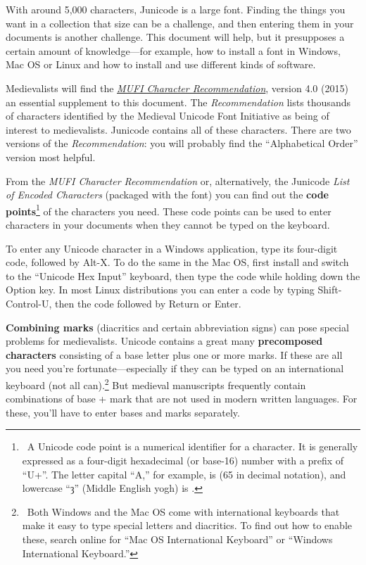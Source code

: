 With around 5,000 characters, Junicode is a large font. Finding the things you
want in a collection that size can be a challenge, and then entering them in your
documents is another challenge. This document will help, but it
presupposes a certain amount of knowledge—for example, how to install a font in
Windows, Mac OS or Linux and how to install and use different kinds of software.

Medievalists will find the \href{https://bora.uib.no/bora-xmlui/handle/1956/10699}%
{\textit{MUFI Character Recommendation}}, version 4.0 (2015)
an essential supplement to this document. The \textit{Recommendation} lists
thousands of characters identified by the
Medieval Unicode Font Initiative as being of interest to medievalists. Junicode
contains all of these characters. There are two versions of the \textit{Recommendation}:
you will probably find the “Alphabetical Order” version most helpful.

From the \textit{MUFI Character Recommendation} or, alternatively, the Junicode
\textit{List of Encoded Characters} (packaged with the font) you can find out
the \textbf{code points}\footnote{\ A Unicode code point is a numerical identifier for a character.
It is generally expressed as a
four-digit hexadecimal (or base-16) number with a prefix of ``U+''. The letter
capital ``A,'' for example, is  (65
in decimal notation), and lowercase ``ȝ'' (Middle English yogh) is .}
of the characters you need. These code points can be used to enter
characters in your documents when they cannot be typed on the keyboard.

To enter any Unicode character in a Windows application, type its four-digit
code, followed by Alt-X. To do the same in the Mac OS, first install and switch
to the “Unicode Hex Input” keyboard, then type the code while holding down the Option
key. In most Linux distributions you can enter a code by typing Shift-Control-U,
then the code followed by Return or Enter.

\textbf{Combining marks} (diacritics and certain abbreviation signs) can pose special problems for
medievalists. Unicode contains a great
many \textbf{precomposed characters} consisting of a base letter plus one or more marks.
If these are all you need you're fortunate---especially if they can be
typed on an international keyboard (not all can).\footnote{\ Both
Windows and the Mac OS come with international keyboards that make it easy to
type special letters and diacritics. To find out how to enable these, search
online for “Mac OS International Keyboard” or “Windows International Keyboard.”}
But medieval manuscripts frequently contain
combinations of base + mark that are not used in modern written languages.
For these, you'll have to
enter bases and marks separately.


